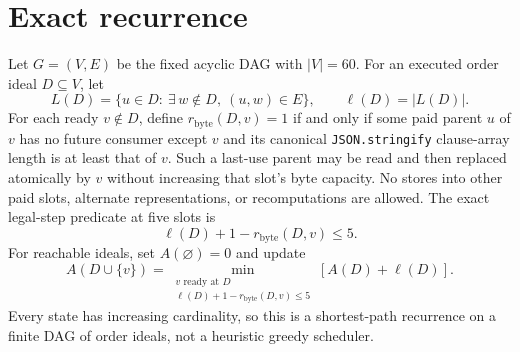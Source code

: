 \documentclass[11pt]{article}
\begin{document}
\section*{Exact recurrence}
Let $G=(V,E)$ be the fixed acyclic DAG with $|V|=60$. For an executed order ideal $D\subseteq V$, let
\[
L(D)=\{u\in D:\ \exists\,w\notin D,\ (u,w)\in E\},\qquad \ell(D)=|L(D)|.
\]
For each ready $v\notin D$, define $r_{\mathrm{byte}}(D,v)=1$ if and only if some paid parent $u$ of $v$ has no future consumer except $v$ and its canonical \texttt{JSON.stringify} clause-array length is at least that of $v$. Such a last-use parent may be read and then replaced atomically by $v$ without increasing that slot's byte capacity. No stores into other paid slots, alternate representations, or recomputations are allowed. The exact legal-step predicate at five slots is
\[
\ell(D)+1-r_{\mathrm{byte}}(D,v)\leq 5.
\]
For reachable ideals, set $A(\varnothing)=0$ and update
\[
A(D\cup\{v\})=\min_{\substack{v\text{ ready at }D\\
\ell(D)+1-r_{\mathrm{byte}}(D,v)\leq5}}
\left[A(D)+\ell(D)\right].
\]
Every state has increasing cardinality, so this is a shortest-path recurrence on a finite DAG of order ideals, not a heuristic greedy scheduler.
\end{document}
